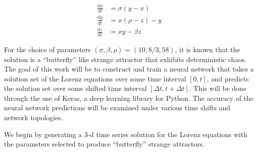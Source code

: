 \documentclass[11pt]{article}
\begin{document}
\begin{align*}
\frac{dx}{dt} &= \sigma(y-x) \\
\frac{dy}{dt} &= x(\rho-z)-y \\
\frac{dz}{dt} &= xy-\beta z
\end{align*}

For the choice of parameters \((\sigma,\beta,\rho) = (10,8/3,58)\), it
is known that the solution is a ``butterfly'' like strange attractor
that exhibits deterministic chaos. The goal of this work will be to
construct and train a neural network that takes a solution set of the
Lorenz equations over some time interval \([0,t]\), and predicts the
solution set over some shifted time interval \([\Delta t,t+ \Delta t]\).
This will be done through the use of Keras, a deep learning library for
Python. The accuracy of the neural network predictions will be examined
under various time shifts and network topologies.

    We begin by generating a 3-d time series solution for the Lorenz
equations with the parameters selected to produce ``butterfly'' strange
attractors.
\end{document}
